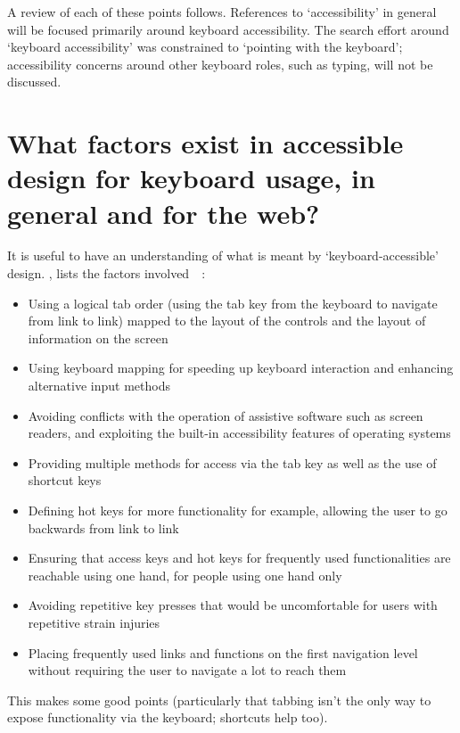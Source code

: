 \documentclass[a4paper, 12pt]{report}
\begin{document}
A review of each of these points follows. References to `accessibility' in general will be focused primarily around keyboard accessibility. The search effort around `keyboard accessibility' was constrained to `pointing with the keyboard'; accessibility concerns around other keyboard roles, such as typing, will not be discussed.

\section{What factors exist in accessible design for keyboard usage, in general and for the web?}
It is useful to have an understanding of what is meant by `keyboard-accessible' design. \citeauthor{deng}, \citeyear{deng} lists the factors involved~\cite{deng}~\parencite[as cited in][]{dellaporta2007web}:
\begin{itemize}
\item Using a logical tab order (using the tab key from the keyboard to navigate from link to link) mapped to the layout of the controls and the layout of information on the screen
\item Using keyboard mapping for speeding up keyboard interaction and enhancing alternative input methods
\item Avoiding conflicts with the operation of assistive software such as screen readers, and exploiting the built-in accessibility features of operating systems
\item Providing multiple methods for access via the tab key as well as the use of shortcut keys
\item Defining hot keys for more functionality for example, allowing the user to go backwards from link to link
\item Ensuring that access keys and hot keys for frequently used functionalities are reachable using one hand, for people using one hand only
\item Avoiding repetitive key presses that would be uncomfortable for users with repetitive strain injuries
\item Placing frequently used links and functions on the first navigation level without requiring the user to navigate a lot to reach them
\end{itemize}
This makes some good points (particularly that tabbing isn't the only way to expose functionality via the keyboard; shortcuts help too).
\end{document}
